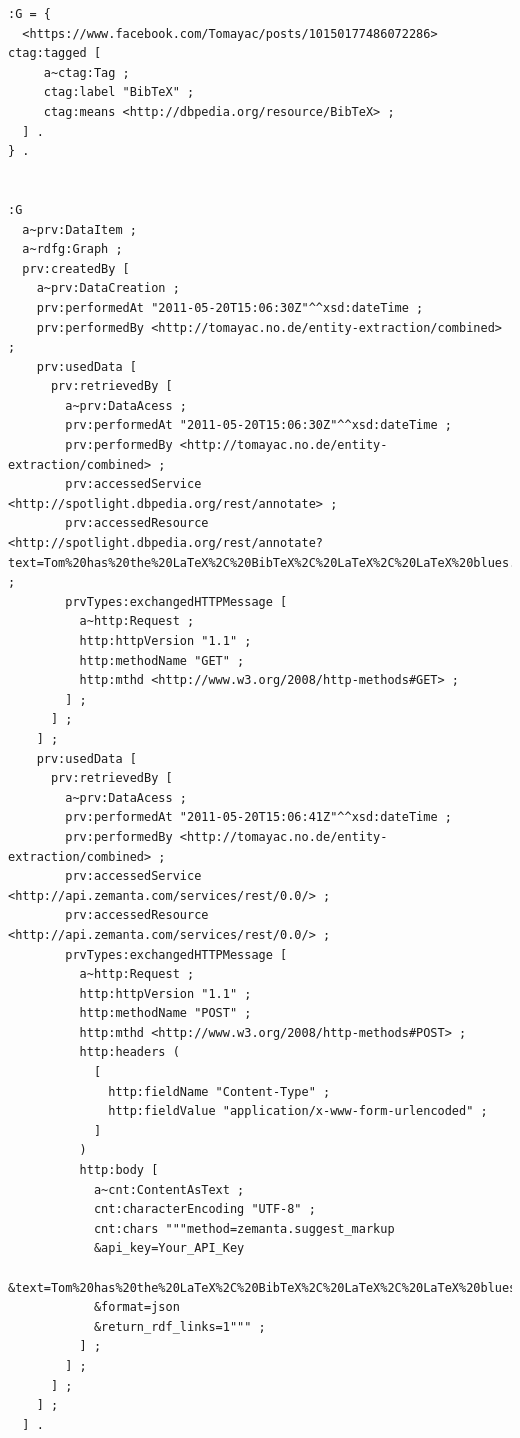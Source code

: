 \begin{lstlisting}
:G = {
  <https://www.facebook.com/Tomayac/posts/10150177486072286> ctag:tagged [
     a~ctag:Tag ;
     ctag:label "BibTeX" ;
     ctag:means <http://dbpedia.org/resource/BibTeX> ;
  ] .
} .


:G
  a~prv:DataItem ;
  a~rdfg:Graph ;
  prv:createdBy [
    a~prv:DataCreation ;
    prv:performedAt "2011-05-20T15:06:30Z"^^xsd:dateTime ;
    prv:performedBy <http://tomayac.no.de/entity-extraction/combined> ;
    prv:usedData [
      prv:retrievedBy [
        a~prv:DataAcess ;
        prv:performedAt "2011-05-20T15:06:30Z"^^xsd:dateTime ;
        prv:performedBy <http://tomayac.no.de/entity-extraction/combined> ;
        prv:accessedService <http://spotlight.dbpedia.org/rest/annotate> ;
        prv:accessedResource <http://spotlight.dbpedia.org/rest/annotate?text=Tom%20has%20the%20LaTeX%2C%20BibTeX%2C%20LaTeX%2C%20LaTeX%20blues...&confidence=0.4&support=20> ;
        prvTypes:exchangedHTTPMessage [
          a~http:Request ;
          http:httpVersion "1.1" ;
          http:methodName "GET" ;
          http:mthd <http://www.w3.org/2008/http-methods#GET> ;
        ] ;
      ] ;
    ] ;
    prv:usedData [
      prv:retrievedBy [
        a~prv:DataAcess ;
        prv:performedAt "2011-05-20T15:06:41Z"^^xsd:dateTime ;
        prv:performedBy <http://tomayac.no.de/entity-extraction/combined> ;
        prv:accessedService <http://api.zemanta.com/services/rest/0.0/> ;
        prv:accessedResource <http://api.zemanta.com/services/rest/0.0/> ;
        prvTypes:exchangedHTTPMessage [
          a~http:Request ;
          http:httpVersion "1.1" ;
          http:methodName "POST" ;
          http:mthd <http://www.w3.org/2008/http-methods#POST> ;
          http:headers (
            [
              http:fieldName "Content-Type" ;
              http:fieldValue "application/x-www-form-urlencoded" ;
            ]   
          )
          http:body [
            a~cnt:ContentAsText ;
            cnt:characterEncoding "UTF-8" ;
            cnt:chars """method=zemanta.suggest_markup
            &api_key=Your_API_Key
            &text=Tom%20has%20the%20LaTeX%2C%20BibTeX%2C%20LaTeX%2C%20LaTeX%20blues...
            &format=json
            &return_rdf_links=1""" ;
          ] ;
        ] ;
      ] ;
    ] ;
  ] .
\end{lstlisting}

